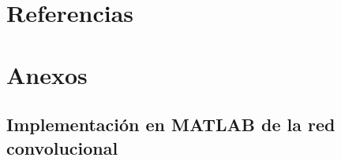 \documentclass[11pt, letterpaper]{article}
\begin{document}
\newpage

	
\section{Referencias}  %

\newpage
	
\section{Anexos}	

\subsection{Implementación  en MATLAB de la red convolucional}
\end{document}
